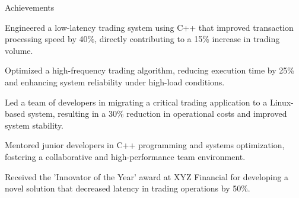 \documentclass{resume} %
\begin{document}
    \begin{rSection}{Achievements}
        \begin{rSubsection}{}{}{}
                            \item Engineered a low{-}latency trading system using C++ that improved transaction processing speed by 40\%, directly contributing to a 15\% increase in trading volume.
                            \item Optimized a high{-}frequency trading algorithm, reducing execution time by 25\% and enhancing system reliability under high{-}load conditions.
                            \item Led a team of developers in migrating a critical trading application to a Linux{-}based system, resulting in a 30\% reduction in operational costs and improved system stability.
                            \item Mentored junior developers in C++ programming and systems optimization, fostering a collaborative and high{-}performance team environment.
                            \item Received the 'Innovator of the Year' award at XYZ Financial for developing a novel solution that decreased latency in trading operations by 50\%.
                    \end{rSubsection}
    \end{rSection}
\end{document}
